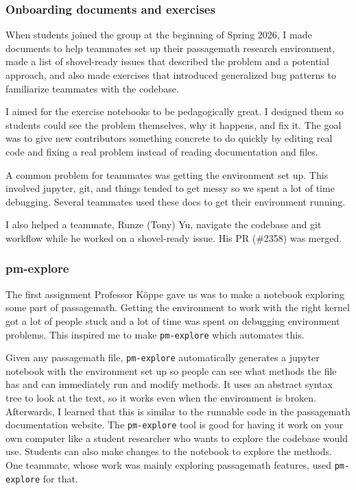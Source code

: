 \documentclass[10pt]{article}
\begin{document}
\subsubsection{Onboarding documents and exercises}

When students joined the group at the beginning of Spring 2026, I made documents to help teammates set up their passagemath research environment, made a list of shovel-ready issues that described the problem and a potential approach, and also made exercises that introduced generalized bug patterns to familiarize teammates with the codebase.

I aimed for the exercise notebooks to be pedagogically great. I designed them so students could see the problem themselves, why it happens, and fix it. The goal was to give new contributors something concrete to do quickly by editing real code and fixing a real problem instead of reading documentation and files.

A common problem for teammates was getting the environment set up. This involved jupyter, git, and things tended to get messy so we spent a lot of time debugging. Several teammates used these docs to get their environment running.

I also helped a teammate, Runze (Tony) Yu, navigate the codebase and git workflow while he worked on a shovel-ready issue. His PR (\#2358) was merged.

\subsubsection{pm-explore}

The first assignment Professor Köppe gave us was to make a notebook exploring some part of passagemath. Getting the environment to work with the right kernel got a lot of people stuck and a lot of time was spent on debugging environment problems. This inspired me to make \texttt{pm-explore} which automates this.

Given any passagemath file, \texttt{pm-explore} automatically generates a jupyter notebook with the environment set up so people can see what methods the file has and can immediately run and modify methods. It uses an abstract syntax tree to look at the text, so it works even when the environment is broken. Afterwards, I learned that this is similar to the runnable code in the passagemath documentation website. The \texttt{pm-explore} tool is good for having it work on your own computer like a student researcher who wants to explore the codebase would use. Students can also make changes to the notebook to explore the methods. One teammate, whose work was mainly exploring passagemath features, used \texttt{pm-explore} for that.
\end{document}
